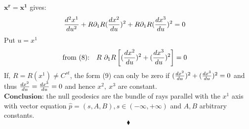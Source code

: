 $\boldsymbol{x^r = x^1}$ gives:
\begin{align}\dv[2] {x^1}{u} +R\partial_1R(\dv{x^2}{u})^2+R \partial_1  R(\dv{x^3}{u})^2 &= 0
\end{align}
Put $ u = x^1$
\begin{align}
\text{from (8):}\quad R \ \partial_1 R \left[ (\dv{x^2}{u})^2+(\dv{x^3}{u})^2 \right] &= 0
\end{align}
If, $R= R(x^1) \ne C^{st}$, the form (9) can only be zero if $(\dv{x^2}{u})^2+(\dv{x^3}{u})^2 = 0$ and thus $\dv{x^2}{u}=\dv{x^3}{u} = 0$ and hence $x^2, \ x^3 $ are constant.\\
$\textbf{Conclusion:}$ the null geodesics are the bundle of rays parallel with the $x^1$ axis with vector equation $\widehat{p} = (s,A,B), s \in (-\infty, +\infty)$ and $A,B$ arbitrary constants.
$$\blacklozenge$$
\newpage

